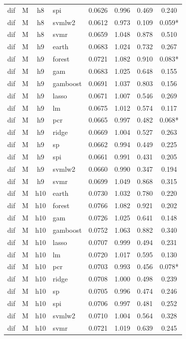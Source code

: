 \begin{ThreePartTable}
\begin{longtable}[t]{llclcccc}
dif & M & h8 & spi & 0.0626 & 0.996 & 0.469 & 0.240\\
dif & M & h8 & svmlw2 & 0.0612 & 0.973 & 0.109 & 0.059*\\
dif & M & h8 & svmr & 0.0659 & 1.048 & 0.878 & 0.510\\
\addlinespace
dif & M & h9 & earth & 0.0683 & 1.024 & 0.732 & 0.267\\
dif & M & h9 & forest & 0.0721 & 1.082 & 0.910 & 0.083*\\
dif & M & h9 & gam & 0.0683 & 1.025 & 0.648 & 0.155\\
dif & M & h9 & gamboost & 0.0691 & 1.037 & 0.803 & 0.156\\
dif & M & h9 & lasso & 0.0671 & 1.007 & 0.546 & 0.269\\
dif & M & h9 & lm & 0.0675 & 1.012 & 0.574 & 0.117\\
dif & M & h9 & pcr & 0.0665 & 0.997 & 0.482 & 0.068*\\
dif & M & h9 & ridge & 0.0669 & 1.004 & 0.527 & 0.263\\
dif & M & h9 & sp & 0.0662 & 0.994 & 0.449 & 0.225\\
dif & M & h9 & spi & 0.0661 & 0.991 & 0.431 & 0.205\\
dif & M & h9 & svmlw2 & 0.0660 & 0.990 & 0.347 & 0.194\\
dif & M & h9 & svmr & 0.0699 & 1.049 & 0.868 & 0.315\\
\addlinespace
dif & M & h10 & earth & 0.0730 & 1.032 & 0.780 & 0.220\\
dif & M & h10 & forest & 0.0766 & 1.082 & 0.921 & 0.202\\
dif & M & h10 & gam & 0.0726 & 1.025 & 0.641 & 0.148\\
dif & M & h10 & gamboost & 0.0752 & 1.063 & 0.882 & 0.340\\
dif & M & h10 & lasso & 0.0707 & 0.999 & 0.494 & 0.231\\
dif & M & h10 & lm & 0.0720 & 1.017 & 0.595 & 0.130\\
dif & M & h10 & pcr & 0.0703 & 0.993 & 0.456 & 0.078*\\
dif & M & h10 & ridge & 0.0708 & 1.000 & 0.498 & 0.239\\
dif & M & h10 & sp & 0.0705 & 0.996 & 0.474 & 0.246\\
dif & M & h10 & spi & 0.0706 & 0.997 & 0.481 & 0.252\\
dif & M & h10 & svmlw2 & 0.0710 & 1.004 & 0.564 & 0.328\\
dif & M & h10 & svmr & 0.0721 & 1.019 & 0.639 & 0.245\\

\end{longtable}
\end{ThreePartTable}

